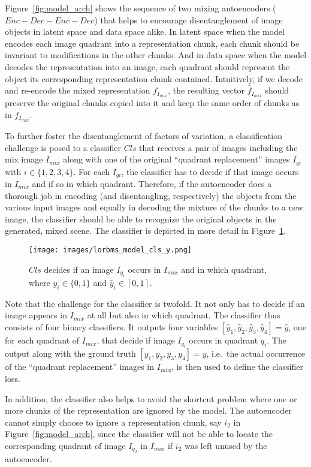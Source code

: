\documentclass[a4paper,12pt]{report}
\begin{document}
Figure~\ref{fig:model_arch} shows the sequence of two mixing autoencoders ($Enc-Dec-Enc-Dec$) that helps to encourage disentanglement of image objects in latent space and data space alike. In latent space when the model encodes each image quadrant into a representation chunk, each chunk should be invariant to modifications in the other chunks. And in data space when the model decodes the representation into an image, each quadrant should represent the object its corresponding representation chunk contained. Intuitively, if we decode and re-encode the mixed representation $f_{I_{mix}}$, the resulting vector $\hat{f}_{I_{mix}}$ should preserve the original chunks copied into it and keep the same order of chunks as in $f_{I_{mix}}$.

To further foster the disentanglement of factors of variation, a classification challenge is posed to a classifier $Cls$ that receives a pair of images including the mix image $I_{mix}$ along with one of the original ``quadrant replacement'' images $I_{qi}$ with $i \in \{1,2,3,4\}$. For each $I_{qi}$, the classifier has to decide if that image occurs in $I_{mix}$ and if so in which quadrant. Therefore, if the autoencoder does a thorough job in encoding (and disentangling, respectively) the objects from the various input images and equally in decoding the mixture of the chunks to a new image, the classifier should be able to recognize the original objects in the generated, mixed scene. The classifier is depicted in more detail in Figure~\ref{fig:model_cls}.
\begin{figure}[ht]
\centering
\texttt{[image: images/lorbms\_model\_cls\_y.png]}
\caption[Schematic of the classifier.]{$Cls$ decides if an image $I_{q_i}$ occurs in $I_{mix}$ and in which quadrant, where $y_i \in \{0,1\}$ and $\hat{y}_i \in [0,1]$.}
\label{fig:model_cls}
\end{figure}
Note that the challenge for the classifier is twofold. It not only has to decide if an image appears in $I_{mix}$ at all but also in which quadrant. The classifier thus consists of four binary classifiers. It outputs four variables $[\hat{y}_1,\hat{y}_2,\hat{y}_3,\hat{y}_4] = \hat{y}$, one for each quadrant of $I_{mix}$, that decide if image $I_{q_i}$ occurs in quadrant $q_i$. The output along with the ground truth $[y_1,y_2,y_3,y_4] = y$, i.e.\ the actual occurrence of the ``quadrant replacement'' images in $I_{mix}$, is then used to define the classifier loss. 

In addition, the classifier also helps to avoid the shortcut problem \cite{ChallengInDisentIFoF} where one or more chunks of the representation are ignored by the model. The autoencoder cannot simply choose to ignore a representation chunk, say $i_2$ in Figure~\ref{fig:model_arch}, since the classifier will not be able to locate the corresponding quadrant of image $I_{q_2}$ in $I_{mix}$ if $i_2$ was left unused by the autoencoder.
\end{document}
